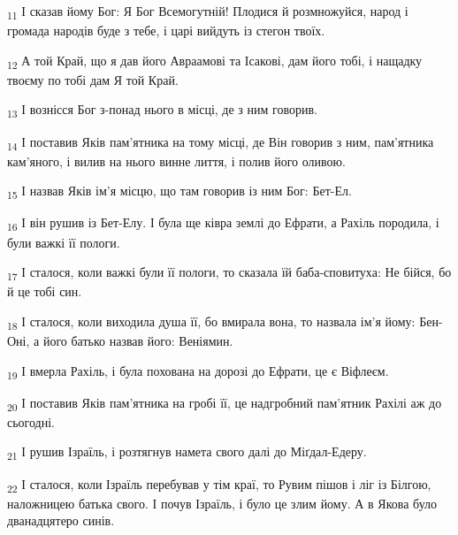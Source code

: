 \begin{tcolorbox}
\textsubscript{11} І сказав йому Бог: Я Бог Всемогутній! Плодися й розмножуйся, народ і громада народів буде з тебе, і царі вийдуть із стегон твоїх.
\end{tcolorbox}
\begin{tcolorbox}
\textsubscript{12} А той Край, що я дав його Авраамові та Ісакові, дам його тобі, і нащадку твоєму по тобі дам Я той Край.
\end{tcolorbox}
\begin{tcolorbox}
\textsubscript{13} І вознісся Бог з-понад нього в місці, де з ним говорив.
\end{tcolorbox}
\begin{tcolorbox}
\textsubscript{14} І поставив Яків пам'ятника на тому місці, де Він говорив з ним, пам'ятника кам'яного, і вилив на нього винне лиття, і полив його оливою.
\end{tcolorbox}
\begin{tcolorbox}
\textsubscript{15} І назвав Яків ім'я місцю, що там говорив із ним Бог: Бет-Ел.
\end{tcolorbox}
\begin{tcolorbox}
\textsubscript{16} І він рушив із Бет-Елу. І була ще ківра землі до Ефрати, а Рахіль породила, і були важкі її пологи.
\end{tcolorbox}
\begin{tcolorbox}
\textsubscript{17} І сталося, коли важкі були її пологи, то сказала їй баба-сповитуха: Не бійся, бо й це тобі син.
\end{tcolorbox}
\begin{tcolorbox}
\textsubscript{18} І сталося, коли виходила душа її, бо вмирала вона, то назвала ім'я йому: Бен-Оні, а його батько назвав його: Веніямин.
\end{tcolorbox}
\begin{tcolorbox}
\textsubscript{19} І вмерла Рахіль, і була похована на дорозі до Ефрати, це є Віфлеєм.
\end{tcolorbox}
\begin{tcolorbox}
\textsubscript{20} І поставив Яків пам'ятника на гробі її, це надгробний пам'ятник Рахілі аж до сьогодні.
\end{tcolorbox}
\begin{tcolorbox}
\textsubscript{21} І рушив Ізраїль, і розтягнув намета свого далі до Міґдал-Едеру.
\end{tcolorbox}
\begin{tcolorbox}
\textsubscript{22} І сталося, коли Ізраїль перебував у тім краї, то Рувим пішов і ліг із Білгою, наложницею батька свого. І почув Ізраїль, і було це злим йому. А в Якова було дванадцятеро синів.
\end{tcolorbox}

